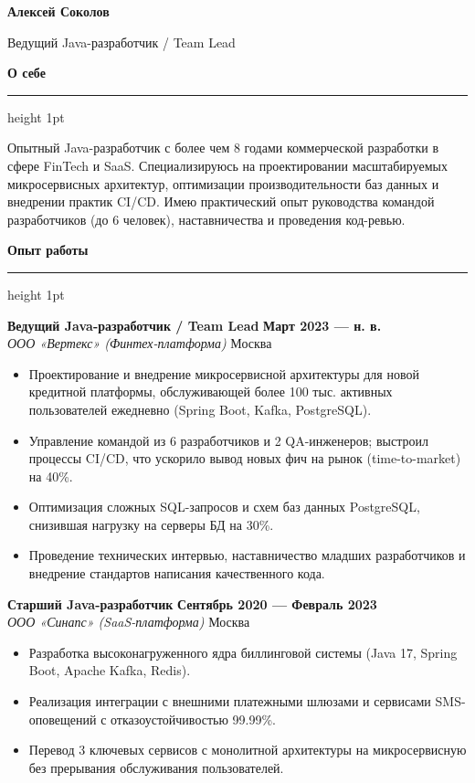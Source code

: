 \documentclass[10pt,a4paper]{article}
\newcommand{\cvsection}[1]{%
  \vspace{12pt}%
  {\color{accentcolor}\large\bfseries #1}%
  \vspace{3pt}%
  {\color{dividercolor}\hrule height 1pt}%
  \vspace{6pt}%
}
\begin{document}
\begin{minipage}[t]{0.68\textwidth}
  {\Huge\bfseries\color{accentcolor} Алексей Соколов}
  
  \vspace{4pt}
  {\Large\color{graycolor} Ведущий Java-разработчик / Team Lead}
  
  \vspace{10pt}

  \cvsection{О себе}
  Опытный Java-разработчик с более чем 8 годами коммерческой разработки в сфере FinTech и SaaS. Специализируюсь на проектировании масштабируемых микросервисных архитектур, оптимизации производительности баз данных и внедрении практик CI/CD. Имею практический опыт руководства командой разработчиков (до 6 человек), наставничества и проведения код-ревью.

  \cvsection{Опыт работы}

  \textbf{Ведущий Java-разработчик / Team Lead} \hfill \textbf{Март 2023 — н. в.} \\
  \textit{ООО «Вертекс» (Финтех-платформа)} \hfill \textcolor{graycolor}{Москва}
  \begin{itemize}[leftmargin=12pt,itemsep=3pt,topsep=3pt]
    \item Проектирование и внедрение микросервисной архитектуры для новой кредитной платформы, обслуживающей более 100 тыс. активных пользователей ежедневно (Spring Boot, Kafka, PostgreSQL).
    \item Управление командой из 6 разработчиков и 2 QA-инженеров; выстроил процессы CI/CD, что ускорило вывод новых фич на рынок (time-to-market) на 40\%.
    \item Оптимизация сложных SQL-запросов и схем баз данных PostgreSQL, снизившая нагрузку на серверы БД на 30\%.
    \item Проведение технических интервью, наставничество младших разработчиков и внедрение стандартов написания качественного кода.
  \end{itemize}

  \vspace{10pt}

  \textbf{Старший Java-разработчик} \hfill \textbf{Сентябрь 2020 — Февраль 2023} \\
  \textit{ООО «Синапс» (SaaS-платформа)} \hfill \textcolor{graycolor}{Москва}
  \begin{itemize}[leftmargin=12pt,itemsep=3pt,topsep=3pt]
    \item Разработка высоконагруженного ядра биллинговой системы (Java 17, Spring Boot, Apache Kafka, Redis).
    \item Реализация интеграции с внешними платежными шлюзами и сервисами SMS-оповещений с отказоустойчивостью 99.99\%.
    \item Перевод 3 ключевых сервисов с монолитной архитектуры на микросервисную без прерывания обслуживания пользователей.
  \end{itemize}


\end{minipage}
\end{document}
